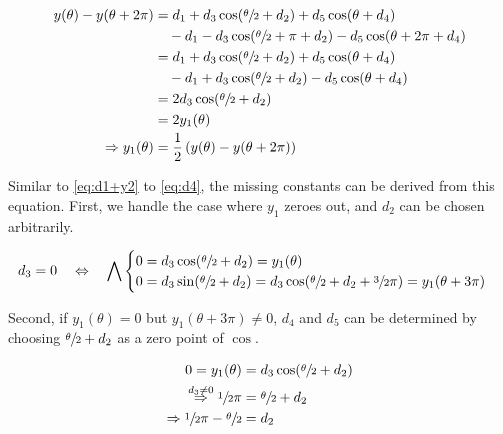 \begin{equation}
    \label{eq:y1}
    \begin{split}
        y(\theta) - y(\theta + 2\pi)
            &= d_1 + d_3 \cos(\sfrac\theta2 + d_2) + d_5 \cos(\theta + d_4)\\
                &\quad - d_1 - d_3 \cos(\sfrac\theta2 + \pi + d_2) - d_5 \cos(\theta + 2\pi + d_4)\\
            &= d_1 + d_3 \cos(\sfrac\theta2 + d_2) + d_5 \cos(\theta + d_4)\\
                &\quad - d_1 + d_3 \cos(\sfrac\theta2 + d_2) - d_5 \cos(\theta + d_4)\\
            &= 2 d_3 \cos(\sfrac\theta2 + d_2)\\
            &= 2 y_1(\theta)\\
        \Rightarrow y_1(\theta) &= \frac12\left(y(\theta) - y(\theta + 2\pi)\right)
    \end{split}
\end{equation}

Similar to \ref{eq:d1+y2} to \ref{eq:d4}, the missing constants can be derived
from this equation.
First, we handle the case where $y_1$ zeroes out, and $d_2$ can be chosen
arbitrarily.

\begin{equation}
    \label{eq:d3-0}
    d_3 = 0 \quad\Leftrightarrow\quad \bigwedge
    \begin{cases}
        0 = d_3 \cos(\sfrac\theta2 + d_2) = y_1(\theta) \\
        0 = d_3 \sin(\sfrac\theta2 + d_2) = d_3 \cos(\sfrac\theta2 + d_2 + \sfrac32\pi) = y_1(\theta + 3\pi)
    \end{cases}
\end{equation}

Second, if $y_1(\theta) = 0$ but $y_1(\theta + 3\pi) \neq 0$, $d_4$ and $d_5$ can
be determined by choosing $\sfrac\theta2 + d_2$ as a zero point of $\cos$.

\begin{equation}
    \label{eq:whateverman-the-second}
    \begin{split}
        0 = y_1(\theta) &= d_3 \cos(\sfrac\theta2 + d_2)\\
        \stackrel{d_3 \neq 0}\Rightarrow \sfrac12\pi &= \sfrac\theta2 + d_2\\
        \Rightarrow \sfrac12\pi - \sfrac\theta2 &= d_2
    \end{split}
\end{equation}

